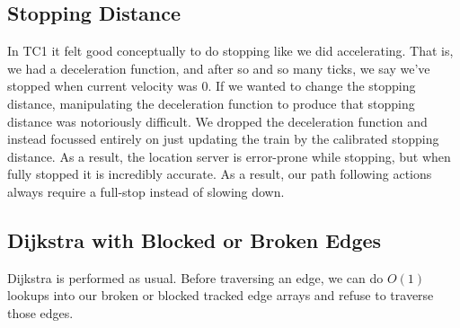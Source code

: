 \documentclass[letterpaper]{article}
\begin{document}
\subsection{Stopping Distance}

In TC1 it felt good conceptually to do stopping like we did accelerating. That is, we had a deceleration function, and after so and so many ticks, we say we've stopped when current velocity was 0. If we wanted to change the stopping distance, manipulating the deceleration function to produce that stopping distance was notoriously difficult. We dropped the deceleration function and instead focussed entirely on just updating the train by the calibrated stopping distance. As a result, the location server is error-prone while stopping, but when fully stopped it is incredibly accurate. As a result, our path following actions always require a full-stop instead of slowing down.

\subsection{Dijkstra with Blocked or Broken Edges}

Dijkstra is performed as usual. Before traversing an edge, we can do $O(1)$ lookups into our broken or blocked tracked edge arrays and refuse to traverse those edges.
\end{document}
